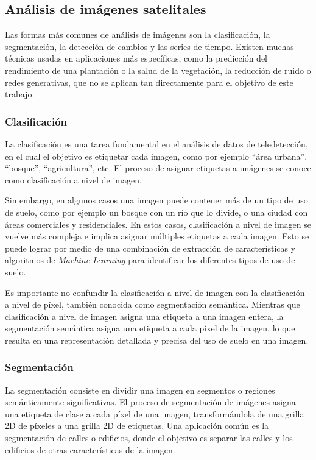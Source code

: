 \subsection{Análisis de imágenes satelitales}

Las formas más comunes de análisis de imágenes son la clasificación, la segmentación, la detección de cambios y las
series de tiempo. Existen muchas técnicas usadas en aplicaciones más específicas, como la predicción del rendimiento de
una plantación o la salud de la vegetación, la reducción de ruido o redes generativas, que no se aplican tan
directamente para el objetivo de este trabajo.

\subsubsection{Clasificación}

La clasificación es una tarea fundamental en el análisis de datos de teledetección, en el cual el objetivo es etiquetar
cada imagen, como por ejemplo \enquote{área urbana}, \enquote{bosque}, \enquote{agricultura}, etc. El proceso de
asignar etiquetas a imágenes se conoce como clasificación a nivel de imagen. \autocite{repo-satellite-image-dl}

Sin embargo, en algunos casos una imagen puede contener más de un tipo de uso de suelo, como por ejemplo un bosque con
un río que lo divide, o una ciudad con áreas comerciales y residenciales. En estos casos, clasificación a nivel de
imagen se vuelve más compleja e implica asignar múltiples etiquetas a cada imagen. Esto se puede lograr por medio de
una combinación de extracción de características y algoritmos de {\it Machine Learning} para identificar los diferentes
tipos de uso de suelo. \autocite{repo-satellite-image-dl}

Es importante no confundir la clasificación a nivel de imagen con la clasificación a nivel de píxel, también conocida
como segmentación semántica. Mientras que clasificación a nivel de imagen asigna una etiqueta a una imagen entera, la
segmentación semántica asigna una etiqueta a cada píxel de la imagen, lo que resulta en una representación detallada y
precisa del uso de suelo en una imagen. \autocite{cole-segmentation}

\subsubsection{Segmentación}

La segmentación consiste en dividir una imagen en segmentos o regiones semánticamente significativas. El proceso de
segmentación de imágenes asigna una etiqueta de clase a cada píxel de una imagen, transformándola de una grilla 2D de
píxeles a una grilla 2D de etiquetas. Una aplicación común es la segmentación de calles o edificios, donde el objetivo
es separar las calles y los edificios de otras características de la imagen. \autocite{repo-satellite-image-dl}

